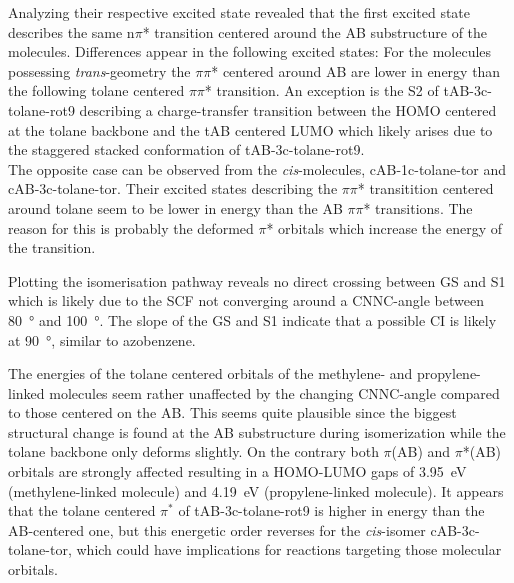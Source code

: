 Analyzing their respective excited state revealed that the first excited state describes the same n$\pi$* transition centered around the AB substructure of the molecules. Differences appear in the following excited states: For the molecules possessing \textit{trans}-geometry the $\pi\pi$* centered around AB are lower in energy than the following tolane centered $\pi\pi$* transition. An exception is the S2 of tAB-3c-tolane-rot9 describing a charge-transfer transition between the HOMO centered at the tolane backbone and the tAB centered LUMO which likely arises due to the staggered stacked conformation of tAB-3c-tolane-rot9. \\
The opposite case can be observed from the \textit{cis}-molecules, cAB-1c-tolane-tor and cAB-3c-tolane-tor. Their excited states describing the $\pi\pi$* transitition centered around tolane seem to be lower in energy than the AB $\pi\pi$* transitions. The reason for this is probably the deformed $\pi$* orbitals which increase the energy of the transition. 
%
%
\begin{comment}
- tAB-1c-tolane:
-quite similar to the tAB and tolane transitions
-intensity of pi pi AB stark reduced
-S1 n pi AB
-S2 pi pi AB
-S6 pi pi tol

-tAB-3c-tolane:
-quite similar to tAB-tolane transitions overall
-intensity of pi pi AB stark reduced
-S1 n pi AB
-S2 pi(tol) pi(AB) charge transfer
-S3 pi pi AB
-S6 pi pi tol

-cAB-1c-tolane
-S1 n pi AB
-S2 pi pi tol
-S3 pi pi AB

-cAB-3c-tolane
-S1 n pi AB
-s2 pi pi tol
-s3 pi pi AB
-no CT transition

- tAB 1c + 3c: pi(AB) pi*(AB) mainly lower excited states; pi(tol) pi*(tol) higher exc. states 
- cAB 1c + 3c: pi  
\end{comment}
%
Plotting the isomerisation pathway reveals no direct crossing between GS and S1 which is likely due to the SCF not converging around a CNNC-angle between \SI{80}{\degree} and \SI{100}{\degree}. The slope of the GS and S1 indicate that a possible CI is likely at \SI{90}{\degree}, similar to azobenzene.
%
\begin{comment}
-no direct crossing observed but that is mainly due to the SCF not converging around a CNNC angle between 80 and 100 deg
-slope of the GS and S1 indicate that the possible CI is likely around 90 deg, similar to AB
\end{comment}
%
The energies of the tolane centered orbitals of the methylene- and propylene-linked molecules seem rather unaffected by the changing CNNC-angle compared to those centered on the AB. This seems quite plausible since the biggest structural change is found at the AB substructure during isomerization while the tolane backbone only deforms slightly. On the contrary both $\pi$(AB) and $\pi$*(AB) orbitals are strongly affected resulting in a HOMO-LUMO gaps of \SI{3.95}{\eV} (methylene-linked molecule) and \SI{4.19}{\eV} (propylene-linked molecule). It appears that the tolane centered $\pi^*$ of tAB-3c-tolane-rot9 is higher in energy than the AB-centered one, but this energetic order reverses for the \textit{cis}-isomer cAB-3c-tolane-tor, which could have implications for reactions targeting those molecular orbitals.\\
